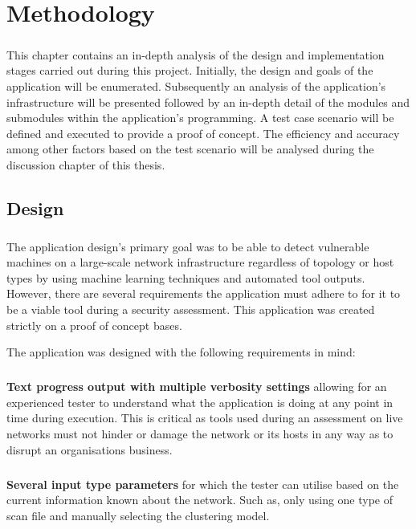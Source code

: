 \chapter{Methodology}
\label{chap:brief}
\paragraph{}This chapter contains an in-depth analysis of the design and implementation stages carried out during this project. Initially, the design and goals of the application will be enumerated. Subsequently an analysis of the application’s infrastructure will be presented followed by an in-depth detail of the modules and submodules within the application’s programming. A test case scenario will be defined and executed to provide a proof of concept. The efficiency and accuracy among other factors based on the test scenario will be analysed during the discussion chapter of this thesis. 
\section{Design}
\label{sec:design}
\paragraph{}The application design’s primary goal was to be able to detect vulnerable machines on a large-scale network infrastructure regardless of topology or host types by using machine learning techniques and automated tool outputs. However, there are several requirements the application must adhere to for it to be a viable tool during a security assessment. This application was created strictly on a proof of concept bases.\linebreak

The application was designed with the following requirements in mind:

\paragraph{}\textbf{Text progress output with multiple verbosity settings} allowing for an experienced tester to understand what the application is doing at any point in time during execution. This is critical as tools used during an assessment on live networks must not hinder or damage the network or its hosts in any way as to disrupt an organisations business.

\paragraph{}\textbf{Several input type parameters} for which the tester can utilise based on the current information known about the network. Such as, only using one type of scan file and manually selecting the clustering model. 

